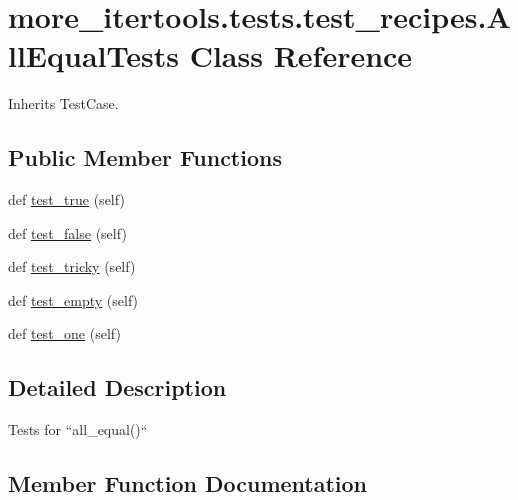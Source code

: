 \hypertarget{classmore__itertools_1_1tests_1_1test__recipes_1_1_all_equal_tests}{}\section{more\+\_\+itertools.\+tests.\+test\+\_\+recipes.\+All\+Equal\+Tests Class Reference}
\label{classmore__itertools_1_1tests_1_1test__recipes_1_1_all_equal_tests}


Inherits Test\+Case.

\subsection*{Public Member Functions}
\begin{DoxyCompactItemize}
\item 
def \hyperlink{classmore__itertools_1_1tests_1_1test__recipes_1_1_all_equal_tests_aab266d8a896c2dc6a5da4e4cf01afa55}{test\+\_\+true} (self)
\item 
def \hyperlink{classmore__itertools_1_1tests_1_1test__recipes_1_1_all_equal_tests_a85401cb6b7527d7aeaa70cbe1a8919b3}{test\+\_\+false} (self)
\item 
def \hyperlink{classmore__itertools_1_1tests_1_1test__recipes_1_1_all_equal_tests_aff65986a267b0f1eb24258beef81b66c}{test\+\_\+tricky} (self)
\item 
def \hyperlink{classmore__itertools_1_1tests_1_1test__recipes_1_1_all_equal_tests_a8090ee54de407312a22caa3a640839b5}{test\+\_\+empty} (self)
\item 
def \hyperlink{classmore__itertools_1_1tests_1_1test__recipes_1_1_all_equal_tests_a7942cdf37c3a61bb60676f6b1ca75a45}{test\+\_\+one} (self)
\end{DoxyCompactItemize}


\subsection{Detailed Description}
\begin{DoxyVerb}Tests for ``all_equal()``\end{DoxyVerb}
 

\subsection{Member Function Documentation}
\mbox{\label{classmore__itertools_1_1tests_1_1test__recipes_1_1_all_equal_tests_a8090ee54de407312a22caa3a640839b5}} 
